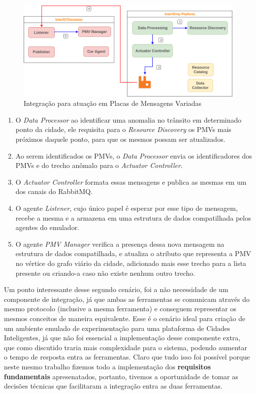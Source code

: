 \begin{figure}[ht]
	\centering
	\includegraphics[width=\textwidth]{figuras/integration-actuate-pmv.png}
	\caption{Integração para atuação em Placas de Mensagens Variadas}
	\label{fig:smart_traffic_actuation}
\end{figure}

\begin{enumerate}
    \item O \textit{Data Processor} ao identificar uma anomalia no trânsito em determinado ponto da cidade, ele requisita para o \textit{Resource Discovery} os PMVs mais próximos
        daquele ponto, para que os mesmos possam ser atualizados.

    \item Ao serem identificados os PMVs, o \textit{Data Processor} envia os identificadores dos PMVs e do trecho anômalo para o \textit{Actuator Controller}.

    \item O \textit{Actuator Controller} formata essas mensagens e publica as mesmas em um dos canais do RabbitMQ.

    \item O agente \textit{Listener}, cujo único papel é esperar por esse tipo de mensagem, recebe a mesma e a armazena em uma estrutura de dados compatilhada pelos agentes do emulador.

    \item O agente \textit{PMV Manager} verifica a presença dessa nova mensagem na estrutura de dados compatilhada, e atualiza o atributo que representa a PMV no vértice do grafo
        viário da cidade, adicionado mais esse trecho para a lista presente ou criando-a caso não existe nenhum outro trecho.
\end{enumerate}

Um ponto interessante desse segundo cenário, foi a não necessidade de um componente de integração, já que ambas as ferramentas se comunicam através do mesmo protocolo (inclusive a
mesma ferramenta) e conseguem representar os mesmos conceitos de maneira equivalente.
Esse é o cenário ideal para criação de um ambiente emulado de experimentação para uma plataforma de Cidades Inteligentes, já que não foi essencial a implementação desse
componente extra, que como discutido traria mais complexidade para o sistema, podendo aumentar o tempo de resposta entra as ferramentas.
Claro que tudo isso foi possível porque neste mesmo trabalho fizemos todo a implementação dos \textbf{requisitos fundamentais} apresenatados, portanto,
tivemos a oportunidade de tomar as decisões técnicas que facilitaram a integração entra as duas ferramentas.

